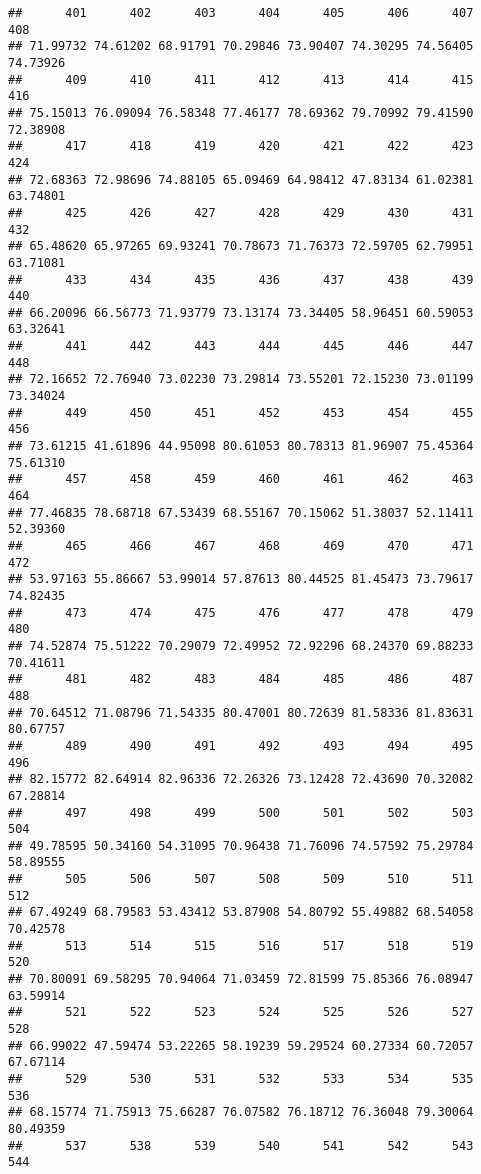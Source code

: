 \documentclass[
]{article}
\begin{document}
\begin{verbatim}
##      401      402      403      404      405      406      407      408 
## 71.99732 74.61202 68.91791 70.29846 73.90407 74.30295 74.56405 74.73926 
##      409      410      411      412      413      414      415      416 
## 75.15013 76.09094 76.58348 77.46177 78.69362 79.70992 79.41590 72.38908 
##      417      418      419      420      421      422      423      424 
## 72.68363 72.98696 74.88105 65.09469 64.98412 47.83134 61.02381 63.74801 
##      425      426      427      428      429      430      431      432 
## 65.48620 65.97265 69.93241 70.78673 71.76373 72.59705 62.79951 63.71081 
##      433      434      435      436      437      438      439      440 
## 66.20096 66.56773 71.93779 73.13174 73.34405 58.96451 60.59053 63.32641 
##      441      442      443      444      445      446      447      448 
## 72.16652 72.76940 73.02230 73.29814 73.55201 72.15230 73.01199 73.34024 
##      449      450      451      452      453      454      455      456 
## 73.61215 41.61896 44.95098 80.61053 80.78313 81.96907 75.45364 75.61310 
##      457      458      459      460      461      462      463      464 
## 77.46835 78.68718 67.53439 68.55167 70.15062 51.38037 52.11411 52.39360 
##      465      466      467      468      469      470      471      472 
## 53.97163 55.86667 53.99014 57.87613 80.44525 81.45473 73.79617 74.82435 
##      473      474      475      476      477      478      479      480 
## 74.52874 75.51222 70.29079 72.49952 72.92296 68.24370 69.88233 70.41611 
##      481      482      483      484      485      486      487      488 
## 70.64512 71.08796 71.54335 80.47001 80.72639 81.58336 81.83631 80.67757 
##      489      490      491      492      493      494      495      496 
## 82.15772 82.64914 82.96336 72.26326 73.12428 72.43690 70.32082 67.28814 
##      497      498      499      500      501      502      503      504 
## 49.78595 50.34160 54.31095 70.96438 71.76096 74.57592 75.29784 58.89555 
##      505      506      507      508      509      510      511      512 
## 67.49249 68.79583 53.43412 53.87908 54.80792 55.49882 68.54058 70.42578 
##      513      514      515      516      517      518      519      520 
## 70.80091 69.58295 70.94064 71.03459 72.81599 75.85366 76.08947 63.59914 
##      521      522      523      524      525      526      527      528 
## 66.99022 47.59474 53.22265 58.19239 59.29524 60.27334 60.72057 67.67114 
##      529      530      531      532      533      534      535      536 
## 68.15774 71.75913 75.66287 76.07582 76.18712 76.36048 79.30064 80.49359 
##      537      538      539      540      541      542      543      544 

\end{verbatim}
\end{document}
